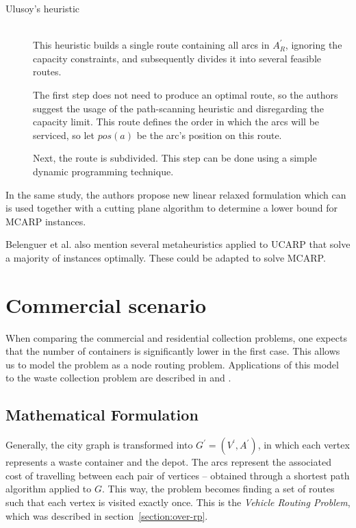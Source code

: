 \begin{description}
\item[Ulusoy's heuristic] \hfill \\
This heuristic builds a single route containing all arcs in $A_R^\prime$,
ignoring the capacity constraints, and subsequently divides it into several
feasible routes.

The first step does not need to produce an optimal route, so the authors
suggest the usage of the path-scanning heuristic and disregarding the capacity
limit. This route defines the order in which the arcs will be serviced, so let
$pos(a)$ be the arc's position on this route.

Next, the route is subdivided. This step can be done using a simple dynamic
programming technique.
\end{description}

In the same study, the authors propose new linear relaxed formulation which can
is used together with a cutting plane algorithm to determine a lower bound for
MCARP instances. 

Belenguer et al. also mention several metaheuristics applied to UCARP that
solve a majority of instances optimally\citep{Belenguer06,Belenguer03}. These
could be adapted to solve MCARP.





\section{Commercial scenario}
\label{section:commercial}

When comparing the commercial and residential collection problems, one expects
that the number of containers is significantly lower in the first case. This
allows us to model the problem as a node routing problem. Applications of this
model to the waste collection problem are described in \citet{Tung2000} and
\citet{Kim06}.

\subsection{Mathematical Formulation}

Generally, the city graph is transformed into $G^\prime = (V^\prime,
A^\prime)$, in which each vertex represents a waste container and the depot.
The arcs represent the associated cost of travelling between each pair of
vertices -- obtained through a shortest path algorithm applied to $G$. This
way, the problem becomes finding a set of routes such that each vertex is
visited exactly once. This is the \textit{Vehicle Routing Problem}, which was
described in section~\ref{section:over-rp}.

